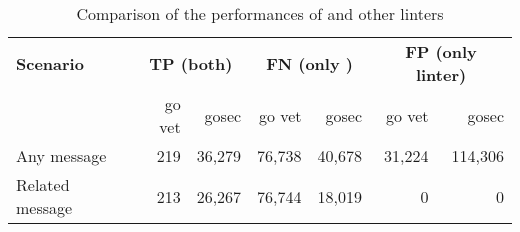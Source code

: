 \begin{table}[htp!]
    \centering
    \caption{Comparison of the performances of \toolGeiger{} and other linters}
    \label{tbl:go-geiger-evaluation-linters}
    \begin{tabular}{l|rr|rr|rr}
        \textbf{Scenario} & \multicolumn{2}{c|}{\textbf{TP (both)}} & \multicolumn{2}{c|}{\textbf{FN (only \toolGeiger{})}} & \multicolumn{2}{c}{\textbf{FP (only linter)}} \\
        {}                & go vet    & gosec              & go vet          & gosec                      & go vet      & gosec                  \\
        \hline
        Any message       & 219       & 36,279             & 76,738          & 40,678                     &  31,224     & 114,306                \\
        Related message   & 213       & 26,267             & 76,744          & 18,019                     &       0     & 0                      \\
    \end{tabular}
\end{table}